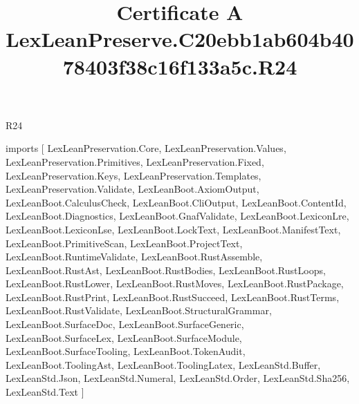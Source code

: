 \begin{lexlean}{R24}
\title{Certificate A LexLeanPreserve.C20ebb1ab604b4078403f38c16f133a5c.R24}
\begin{coremodule}
imports [
  LexLeanPreservation.Core,
  LexLeanPreservation.Values,
  LexLeanPreservation.Primitives,
  LexLeanPreservation.Fixed,
  LexLeanPreservation.Keys,
  LexLeanPreservation.Templates,
  LexLeanPreservation.Validate,
  LexLeanBoot.AxiomOutput,
  LexLeanBoot.CalculusCheck,
  LexLeanBoot.CliOutput,
  LexLeanBoot.ContentId,
  LexLeanBoot.Diagnostics,
  LexLeanBoot.GnafValidate,
  LexLeanBoot.LexiconLre,
  LexLeanBoot.LexiconLse,
  LexLeanBoot.LockText,
  LexLeanBoot.ManifestText,
  LexLeanBoot.PrimitiveScan,
  LexLeanBoot.ProjectText,
  LexLeanBoot.RuntimeValidate,
  LexLeanBoot.RustAssemble,
  LexLeanBoot.RustAst,
  LexLeanBoot.RustBodies,
  LexLeanBoot.RustLoops,
  LexLeanBoot.RustLower,
  LexLeanBoot.RustMoves,
  LexLeanBoot.RustPackage,
  LexLeanBoot.RustPrint,
  LexLeanBoot.RustSucceed,
  LexLeanBoot.RustTerms,
  LexLeanBoot.RustValidate,
  LexLeanBoot.StructuralGrammar,
  LexLeanBoot.SurfaceDoc,
  LexLeanBoot.SurfaceGeneric,
  LexLeanBoot.SurfaceLex,
  LexLeanBoot.SurfaceModule,
  LexLeanBoot.SurfaceTooling,
  LexLeanBoot.TokenAudit,
  LexLeanBoot.ToolingAst,
  LexLeanBoot.ToolingLatex,
  LexLeanStd.Buffer,
  LexLeanStd.Json,
  LexLeanStd.Numeral,
  LexLeanStd.Order,
  LexLeanStd.Sha256,
  LexLeanStd.Text
]


\end{coremodule}
\end{lexlean}
